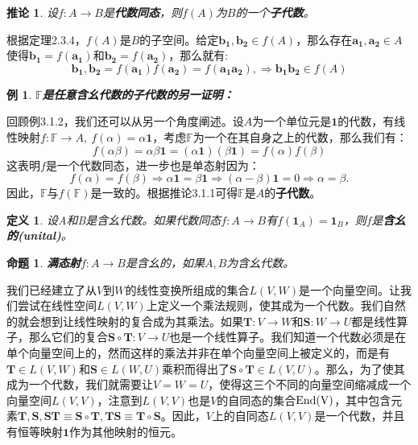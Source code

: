 \documentclass[mathserif,hyperref,UTF8,openany,b5paper]{ctexbook}
\newtheorem{exmp}{例}[section]
\newtheorem{defn}{定义}[section]
\newtheorem{pro}{命题}[section]
\newtheorem{cor}{推论}[section]
\begin{document}
\begin{cor}
设$f:A\xrightarrow{}B$是\textbf{代数同态}，则$f(A)$为$B$的一个\textbf{子代数}。
\end{cor}
根据定理2.3.4，$f(A)$是$B$的子空间。给定$\mathbf{b_1,b_2}\in f(A)$，那么存在$\mathbf{a_1,a_2}\in A$使得$\mathbf{b_1}=f(\mathbf{a_1})$和$\mathbf{b_2}=f(\mathbf{a_2})$，那么就有:
\begin{equation}
    \mathbf{b_1,b_2}=f(\mathbf{a_1})f(\mathbf{a_2})=f(\mathbf{a_1a_2}),\Rightarrow \mathbf{b_1b_2}\in f(A)
\end{equation}
\begin{exmp}
\textbf{$\mathbb{F}$是任意含幺代数的子代数的另一证明：}
\end{exmp}
回顾例3.1.2，我们还可以从另一个角度阐述。设$A$为一个单位元是$\mathbf{1}$的代数，有线性映射$f:\mathbb{F}\xrightarrow{}A,\ f(\alpha)=\alpha\mathbf{1}$，考虑$\mathbb{F}$为一个在其自身之上的代数，那么我们有：
\begin{equation}
    f(\alpha\beta)=\alpha\beta\mathbf{1}=(\alpha\mathbf{1})(\beta\mathbf{1})=f(\alpha)f(\beta)
\end{equation}
这表明$f$是一个代数同态，进一步也是单态射因为：
\begin{equation}
    f(\alpha)=f(\beta)\Rightarrow\alpha\mathbf{1}=\beta\mathbf{1}\Rightarrow(\alpha-\beta)\mathbf{1}=0\Rightarrow\alpha=\beta.
\end{equation}
因此，$\mathbb{F}$与$f(\mathbb{F})$是一致的。根据推论3.1.1可得$\mathbb{F}$是$A$的\textbf{子代数}。
\begin{defn}
    设A和B是含幺代数。如果代数同态$f:A\xrightarrow{} B$有$f(\mathbf{1}_A)=\mathbf{1}_B$，则$f$是\textbf{含幺的(unital)}。
\end{defn}
\begin{pro}
    \textbf{满态射}$f:A\xrightarrow{} B$是含幺的，如果$A,B$为含幺代数。
\end{pro}
我们已经建立了从$V$到$W$的线性变换所组成的集合$L(V,W)$是一个向量空间。让我们尝试在线性空间$L(V,W)$上定义一个乘法规则，使其成为一个代数。我们自然的就会想到让线性映射的复合成为其乘法。如果$\mathbf{T}:V\xrightarrow{}W$和$\mathbf{S}:W\xrightarrow{}U$都是线性算子，那么它们的复合$\mathbf{S\circ T}:V\xrightarrow{}U$也是一个线性算子。我们知道一个代数必须是在单个向量空间上的，然而这样的乘法并非在单个向量空间上被定义的，而是有$\mathbf{T}\in L(V,W)$和$\mathbf{S}\in L(W,U)$乘积而得出了$\mathbf{S\circ T}\in L(V,U)$。那么，为了使其成为一个代数，我们就需要让$V=W=U$，使得这三个不同的向量空间缩减成一个向量空间$L(V,V)$，注意到$L(V,V)$也是$V$的自同态的集合$\rm{End}(V)$，其中包含元素$\mathbf{T,S,ST\equiv S\circ T,TS\equiv T\circ S}$。因此，$V$上的自同态$L(V,V)$是一个代数，并且有恒等映射$\mathbf{1}$作为其他映射的恒元。
\end{document}
